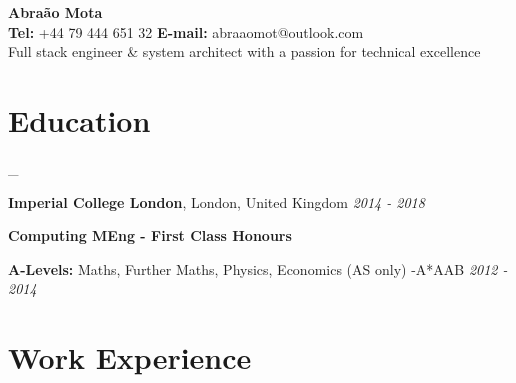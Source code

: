 \documentclass[a4paper,10pt]{article}
\begin{document}
	
	\begin{center}
		{\large\bfseries Abra\~ao Mota} \\

		{\textbf{Tel:} +44 79 444 651 32  } {\textbf{E-mail:} abraaomot@outlook.com } \\ 
	Full stack engineer \&  system architect with a passion for technical excellence
	\end{center}

	\section*{Education}_
		
		\textbf{Imperial College London}, London, United Kingdom \hfill \textit{2014 - 2018}
		
		\textbf{Computing MEng - First Class Honours} 
	

		\textbf{A-Levels:} Maths, Further Maths, Physics, Economics (AS only) -A*AAB  \hfill \textit{2012 - 2014 }
		
		
		
	
	
	
	
	\section*{Work Experience}
	
\end{document}
